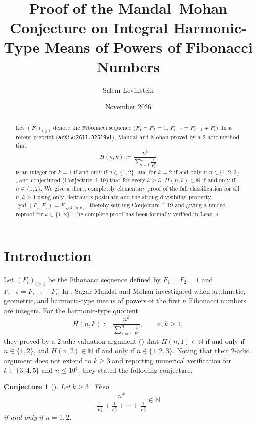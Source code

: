 \documentclass[11pt,a4paper]{article}
\title{Proof of the Mandal--Mohan Conjecture on Integral Harmonic-Type Means of Powers of Fibonacci Numbers}
\author{Salem Levinstein}
\date{November 2026}
\newtheorem{conjecture}[theorem]{Conjecture}
\begin{document}
\maketitle

\begin{abstract}
Let $(F_i)_{i \ge 1}$ denote the Fibonacci sequence ($F_1 = F_2 = 1$, $F_{i+2} = F_{i+1} + F_i$).
In a recent preprint (\texttt{arXiv:2611.32519v1}), Mandal and Mohan proved by a $2$-adic method that
\[
H(n,k) := \frac{n^k}{\displaystyle\sum_{i=1}^n \frac{1}{F_i^k}}
\]
is an integer for $k = 1$ if and only if $n \in \{1,2\}$, and for $k = 2$ if and only if $n \in \{1,2,3\}$, and conjectured (Conjecture~1.19) that for every $k \ge 3$, $H(n,k) \in \mathbb{N}$ if and only if $n \in \{1,2\}$.
We give a short, completely elementary proof of the full classification for all $n,k \ge 1$ using only Bertrand's postulate and the strong divisibility property $\gcd(F_a,F_b) = F_{\gcd(a,b)}$, thereby settling Conjecture~1.19 and giving a unified reproof for $k \in \{1,2\}$.
The complete proof has been formally verified in Lean~4.
\end{abstract}

\section{Introduction}

Let $(F_i)_{i \ge 1}$ be the Fibonacci sequence defined by $F_1 = F_2 = 1$ and $F_{i+2} = F_{i+1} + F_i$.
In \cite{MandalMohan2026}, Sagar Mandal and Mohan investigated when arithmetic, geometric, and harmonic-type means of powers of the first $n$ Fibonacci numbers are integers. For the harmonic-type quotient
\[
H(n,k) := \frac{n^k}{\displaystyle\sum_{i=1}^n \frac{1}{F_i^k}}, \qquad n,k \ge 1,
\]
they proved by a $2$-adic valuation argument (\cite[Theorem~1.18]{MandalMohan2026}) that $H(n,1) \in \mathbb{N}$ if and only if $n \in \{1,2\}$, and $H(n,2) \in \mathbb{N}$ if and only if $n \in \{1,2,3\}$. Noting that their $2$-adic argument does not extend to $k \ge 3$ and reporting numerical verification for $k \in \{3,4,5\}$ and $n \le 10^4$, they stated the following conjecture.

\begin{conjecture}[{\cite[Conjecture~1.19]{MandalMohan2026}}]\label{conj:mm}
Let $k \ge 3$. Then
\[
\frac{n^k}{\displaystyle\frac{1}{F_1^k} + \frac{1}{F_2^k} + \cdots + \frac{1}{F_n^k}} \in \mathbb{N}
\]
if and only if $n = 1, 2$.
\end{conjecture}
\end{document}
